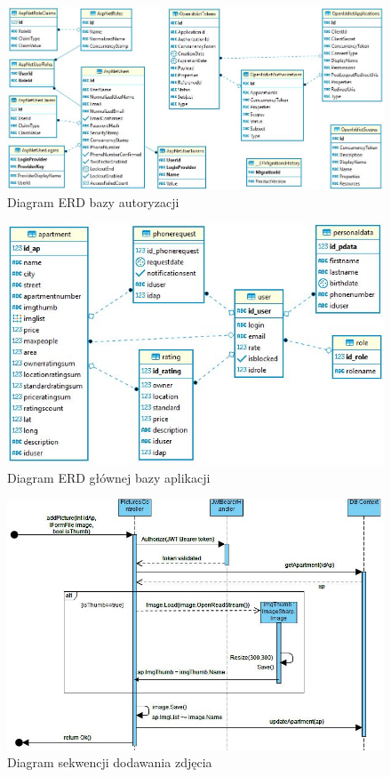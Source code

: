 \documentclass[polish, 11pt]{article}
\begin{document}
        
        \begin{figure}[H]
            \centering
            \includegraphics[width=\textwidth]{figures/AuthERD.jpg}
            \caption{Diagram ERD bazy autoryzacji}
        \end{figure}
        
        \begin{figure}[H]
            \centering
            \includegraphics[width=\textwidth]{figures/TrueHomeERD.jpg}
            \caption{Diagram ERD głównej bazy aplikacji}
        \end{figure}
        
        \begin{figure}[H]
            \centering
            \includegraphics[width=\textwidth]{figures/addPictureSeq.jpg}
            \caption{Diagram sekwencji dodawania zdjęcia}
        \end{figure}
        
\end{document}
